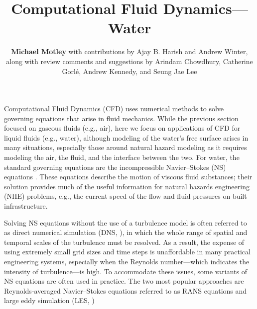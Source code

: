 %
%
%


\title{Computational Fluid Dynamics---Water}
\author{
    \textbf{Michael Motley}
    with contributions by Ajay B. Harish and Andrew Winter,
    \newline
    along with review comments and suggestions by Arindam Chowdhury, Catherine Gorlé, Andrew Kennedy, and Seung Jae Lee
}
\tocauthor{}
%
%
\maketitle

Computational Fluid Dynamics (CFD) uses numerical methods to solve governing equations that arise in fluid mechanics. While the previous section focused on gaseous fluids (e.g., air), here we focus on applications of CFD for liquid fluids (e.g., water), although modeling of the water's free surface arises in many situations, especially those around natural hazard modeling as it requires modeling the air, the fluid, and the interface between the two. For water, the standard governing equations are the incompressible Navier--Stokes (NS) equations \citep{Darrigol2005navier}. These equations describe the motion of viscous fluid substances; their solution provides much of the useful information for natural hazards engineering (NHE) problems, e.g., the current speed of the flow and fluid pressures on built infrastructure.

Solving NS equations without the use of a turbulence model is often referred to as direct numerical simulation (DNS,   \cite{Orszag1970DNS}), in which the whole range of spatial and temporal scales of the turbulence must be resolved. As a result, the expense of using extremely small grid sizes and time steps is unaffordable in many practical engineering systems, especially when the Reynolds number---which indicates the intensity of turbulence---is high. To accommodate these issues, some variants of NS equations are often used in practice. The two most popular approaches are Reynolds-averaged Navier--Stokes equations referred to as RANS equations  \citep{Reynolds1895RANS, Chou1945RANS} and large eddy simulation (LES, \cite{Deardorff1970LES})

